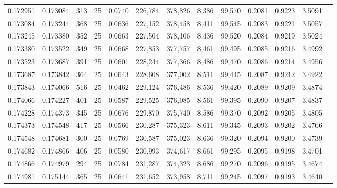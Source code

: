\begin{tabular}{rrrrrrrrrrrrr}
0.172951 & 0.173084 &   313 &  25 &                                     0.0740 & 226,784 & 378,826 &   8,386 &  99,570 & 0.2081 & 0.9223 & 3.5091 \\
0.173084 & 0.173244 &   368 &  25 &                                     0.0636 & 227,152 & 378,458 &   8,411 &  99,545 & 0.2083 & 0.9221 & 3.5057 \\
0.173245 & 0.173380 &   352 &  25 &                                     0.0663 & 227,504 & 378,106 &   8,436 &  99,520 & 0.2084 & 0.9219 & 3.5024 \\
0.173380 & 0.173522 &   349 &  25 &                                     0.0668 & 227,853 & 377,757 &   8,461 &  99,495 & 0.2085 & 0.9216 & 3.4992 \\
0.173523 & 0.173687 &   391 &  25 &                                     0.0601 & 228,244 & 377,366 &   8,486 &  99,470 & 0.2086 & 0.9214 & 3.4956 \\
0.173687 & 0.173842 &   364 &  25 &                                     0.0643 & 228,608 & 377,002 &   8,511 &  99,445 & 0.2087 & 0.9212 & 3.4922 \\
0.173843 & 0.174066 &   516 &  25 &                                     0.0462 & 229,124 & 376,486 &   8,536 &  99,420 & 0.2089 & 0.9209 & 3.4874 \\
0.174066 & 0.174227 &   401 &  25 &                                     0.0587 & 229,525 & 376,085 &   8,561 &  99,395 & 0.2090 & 0.9207 & 3.4837 \\
0.174228 & 0.174373 &   345 &  25 &                                     0.0676 & 229,870 & 375,740 &   8,586 &  99,370 & 0.2092 & 0.9205 & 3.4805 \\
0.174373 & 0.174548 &   417 &  25 &                                     0.0566 & 230,287 & 375,323 &   8,611 &  99,345 & 0.2093 & 0.9202 & 3.4766 \\
0.174548 & 0.174681 &   300 &  25 &                                     0.0769 & 230,587 & 375,023 &   8,636 &  99,320 & 0.2094 & 0.9200 & 3.4739 \\
0.174682 & 0.174866 &   406 &  25 &                                     0.0580 & 230,993 & 374,617 &   8,661 &  99,295 & 0.2095 & 0.9198 & 3.4701 \\
0.174866 & 0.174979 &   294 &  25 &                                     0.0784 & 231,287 & 374,323 &   8,686 &  99,270 & 0.2096 & 0.9195 & 3.4674 \\
0.174981 & 0.175144 &   365 &  25 &                                     0.0641 & 231,652 & 373,958 &   8,711 &  99,245 & 0.2097 & 0.9193 & 3.4640 \\

\end{tabular}
